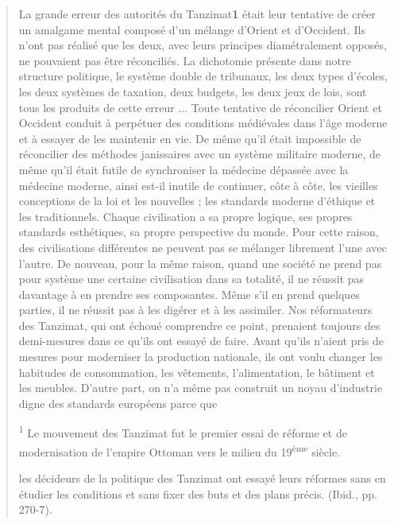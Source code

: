 \begin{quote}
La grande erreur des autorités du Tanzimat\textbf{1} était leur
tentative de créer un amalgame mental composé d'un mélange d'Orient et
d'Occident. Ils n'ont pas réalisé que les deux, avec leurs principes
diamétralement opposés, ne pouvaient pas être réconciliés. La dichotomie
présente dans notre structure politique, le système double de tribunaux,
les deux types d'écoles, les deux systèmes de taxation, deux budgets,
les deux jeux de lois, sont tous les produits de cette erreur ... Toute
tentative de réconcilier Orient et Occident conduit à perpétuer des
conditions médiévales dans l'âge moderne et à essayer de les maintenir
en vie. De même qu'il était impossible de réconcilier des méthodes
janissaires avec un système militaire moderne, de même qu'il était
futile de synchroniser la médecine dépassée avec la médecine moderne,
ainsi est-il inutile de continuer, côte à côte, les vieilles conceptions
de la loi et les nouvelles ; les standards moderne d'éthique et les
traditionnels. Chaque civilisation a sa propre logique, ses propres
standards esthétiques, sa propre perspective du monde. Pour cette
raison, des civilisations différentes ne peuvent pas se mélanger
librement l'une avec l'autre. De nouveau, pour la même raison, quand une
société ne prend pas pour système une certaine civilisation dans sa
totalité, il ne réussit pas davantage à en prendre ses composantes. Même
s'il en prend quelques parties, il ne réussit pas à les digérer et à les
assimiler. Nos réformateurs des Tanzimat, qui ont échoué comprendre ce
point, prenaient toujours des demi-mesures dans ce qu'ils ont essayé de
faire. Avant qu'ils n'aient pris de mesures pour moderniser la
production nationale, ils ont voulu changer les habitudes de
consommation, les vêtements, l'alimentation, le bâtiment et les meubles.
D'autre part, on n'a même pas construit un noyau d'industrie digne des
standards européens parce que

\textsuperscript{1} Le mouvement des Tanzimat fut le premier essai de
réforme et de modernisation de l'empire Ottoman vers le milieu du
19\textsuperscript{ème} siècle.

les décideurs de la politique des Tanzimat ont essayé leurs réformes
sans en étudier les conditions et sans fixer des buts et des plans
précis. (Ibid., pp. 270-7).


\end{quote}
